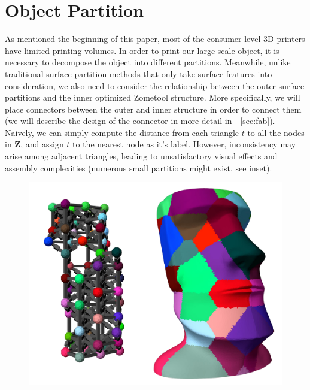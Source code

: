 \section{Object Partition}
\label{sec:surf_part}
As mentioned  the beginning of this paper, most of the consumer-level 3D printers have limited printing volumes.
In order to print our large-scale object, it is necessary to decompose the object into different partitions.
Meanwhile, unlike traditional surface partition methods that only take surface features into consideration, we also need to consider the relationship between the outer surface partitions and the inner optimized Zometool structure.
More specifically, we will place connectors between the outer and inner structure in order to connect them (we will describe the design of the connector in more detail in~\secname~\ref{sec:fab}).
Naively, we can simply compute the distance from each triangle $t$ to all the nodes in $\mathbf{Z}$, and assign $t$ to the nearest node as it's label.
However, inconsistency may arise among adjacent triangles, leading to unsatisfactory visual effects and assembly complexities (numerous small partitions might exist, see inset). 

\begin{figure}
    \centering
    \includegraphics[width=1.0\linewidth]{figs/nearest_node.pdf} 
\end{figure}

